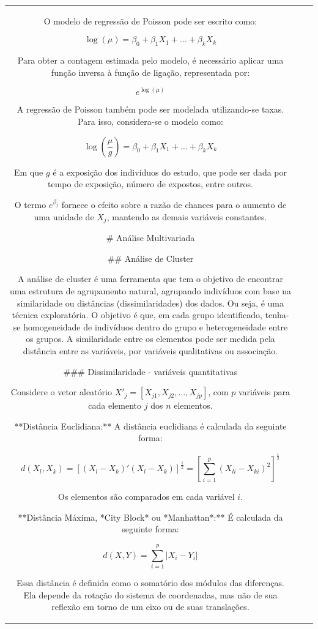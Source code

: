 \documentclass[
]{estat/estat}
\begin{document}
\begin{tabular}{c|cc}
O modelo de regressão de Poisson pode ser escrito como:

$$
\log(\mu) = \beta_0 + \beta_1 X_1 + \ldots + \beta_k X_k
$$

Para obter a contagem estimada pelo modelo, é necessário aplicar uma função inversa à função de ligação, representada por:

$$
e^{\log(\mu)}
$$

A regressão de Poisson também pode ser modelada utilizando-se taxas. Para isso, considera-se o modelo como:

$$
\log\left(\frac{\mu}{g}\right) = \beta_0 + \beta_1 X_1 + \ldots + \beta_k X_k
$$

Em que $g$ é a exposição dos indivíduos do estudo, que pode ser dada por tempo de exposição, número de expostos, entre outros.

O termo $e^{\beta_j}$ fornece o efeito sobre a razão de chances para o aumento de uma unidade de $X_j$, mantendo as demais variáveis constantes.

# Análise Multivariada

## Análise de Cluster

A análise de cluster é uma ferramenta que tem o objetivo de encontrar uma estrutura de agrupamento natural, agrupando indivíduos com base na similaridade ou distâncias (dissimilaridades) dos dados. Ou seja, é uma técnica exploratória. O objetivo é que, em cada grupo identificado, tenha-se homogeneidade de indivíduos dentro do grupo e heterogeneidade entre os grupos. A similaridade entre os elementos pode ser medida pela distância entre as variáveis, por variáveis qualitativas ou associação.

### Dissimilaridade - variáveis quantitativas

Considere o vetor aleatório $X'_{j} = [X_{j1}, X_{j2}, \ldots, X_{jp}]$, com $p$ variáveis para cada elemento $j$ dos $n$ elementos.

**Distância Euclidiana:** A distância euclidiana é calculada da seguinte forma:

$$
d(X_{l},X_{k}) = [(X_{l} - X_{k})'(X_{l} - X_{k})]^{\frac{1}{2}} = \left[ \sum_{i=1}^{p}(X_{li}-X_{ki})^2\right]^{\frac{1}{2}}
$$

Os elementos são comparados em cada variável $i$.

**Distância Máxima, *City Block* ou *Manhattan*:** É calculada da seguinte forma:

$$
d(X,Y) = \sum_{i=1}^{p} |X_{i} - Y_{i}|
$$

Essa distância é definida como o somatório dos módulos das diferenças. Ela depende da rotação do sistema de coordenadas, mas não de sua reflexão em torno de um eixo ou de suas translações.


\end{tabular}
\end{document}
